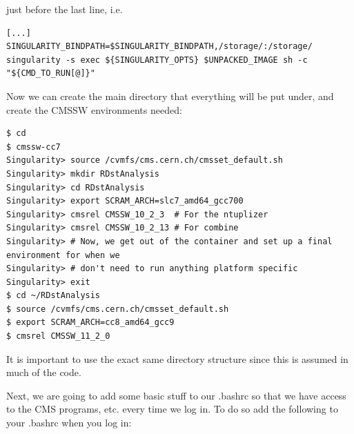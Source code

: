 \documentclass[12pt]{report}
\begin{document}
just before the last line, i.e.

\begin{mdframed}[backgroundcolor=light-gray, roundcorner=10pt,leftmargin=1, rightmargin=1, innerleftmargin=15, innertopmargin=15,innerbottommargin=15, outerlinewidth=1, linecolor=light-gray,roundcorner=20pt]
\begin{lstlisting}
[...]
SINGULARITY_BINDPATH=$SINGULARITY_BINDPATH,/storage/:/storage/
singularity -s exec ${SINGULARITY_OPTS} $UNPACKED_IMAGE sh -c "${CMD_TO_RUN[@]}"
\end{lstlisting}
\end{mdframed}

Now we can create the main directory that everything will be put under, and
create the CMSSW environments needed:
\begin{mdframed}[backgroundcolor=light-gray, roundcorner=10pt,leftmargin=1, rightmargin=1, innerleftmargin=15, innertopmargin=15,innerbottommargin=15, outerlinewidth=1, linecolor=light-gray,roundcorner=20pt]
\begin{lstlisting}
$ cd
$ cmssw-cc7
Singularity> source /cvmfs/cms.cern.ch/cmsset_default.sh
Singularity> mkdir RDstAnalysis
Singularity> cd RDstAnalysis
Singularity> export SCRAM_ARCH=slc7_amd64_gcc700
Singularity> cmsrel CMSSW_10_2_3  # For the ntuplizer
Singularity> cmsrel CMSSW_10_2_13 # For combine
Singularity> # Now, we get out of the container and set up a final environment for when we
Singularity> # don't need to run anything platform specific
Singularity> exit
$ cd ~/RDstAnalysis
$ source /cvmfs/cms.cern.ch/cmsset_default.sh
$ export SCRAM_ARCH=cc8_amd64_gcc9
$ cmsrel CMSSW_11_2_0
\end{lstlisting}
\end{mdframed}
It is important to use the exact same directory structure since this is assumed
in much of the code.

Next, we are going to add some basic stuff to our .bashrc so that we have
access to the CMS programs, etc. every time we log in. To do so add the
following to your .bashrc when you log in:
\end{document}
